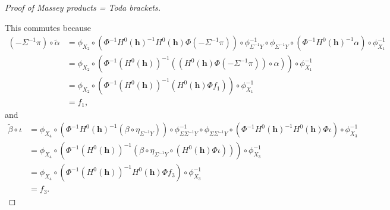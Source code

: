 \begin{proof}[Proof of Massey products = Toda brackets]
\begin{center}
    \end{center}
    This commutes because
    \begin{align*}
        (- \Sigma^{-1} \pi) \circ \tilde{\alpha} &= \phi_{X_2} \circ (\Phi^{-1} H^0(\mathbf{h})^{-1} H^0(\mathbf{h}) \Phi (- \Sigma^{-1} \pi)) \circ \phi^{-1}_{\Sigma^{-1} Y} \circ \phi_{\Sigma^{-1} Y} \circ (\Phi^{-1} H^0(\mathbf{h})^{-1} \alpha) \circ \phi^{-1}_{X_1}\\
        &= \phi_{X_2} \circ (
            \Phi^{-1} (H^0(\mathbf{h}))^{-1} (
                (H^0(\mathbf{h}) \Phi (- \Sigma^{-1} \pi)) \circ \alpha
                )
            ) \circ \phi^{-1}_{X_1} \\
        &= \phi_{X_2} \circ (\Phi^{-1} (H^0(\mathbf{h}))^{-1} (H^0(\mathbf{h}) \Phi f_1)) \circ \phi^{-1}_{X_1} \\
        &= f_1,
    \end{align*}
    and
    \begin{align*}
        \tilde{\beta} \circ \iota &= \phi_{X_4} \circ (\Phi^{-1} H^0(\mathbf{h})^{-1} (\beta \circ \eta_{\Sigma^{-1} Y})) \circ \phi^{-1}_{\Sigma \Sigma^{-1} Y} \circ \phi_{\Sigma \Sigma^{-1} Y} \circ (\Phi^{-1} H^0(\mathbf{h})^{-1} H^0(\mathbf{h}) \Phi \iota) \circ \phi^{-1}_{X_3} \\
        &= \phi_{X_4} \circ (\Phi^{-1} (H^0(\mathbf{h}))^{-1}(\beta \circ \eta_{\Sigma^{-1} Y} \circ (H^0(\mathbf{h}) \Phi \iota))) \circ \phi^{-1}_{X_3} \\
        &= \phi_{X_4} \circ (\Phi^{-1} (H^0(\mathbf{h}))^{-1} H^0(\mathbf{h}) \Phi f_3) \circ \phi^{-1}_{X_3} \\
        &= f_3.
    \end{align*}


\end{proof}
